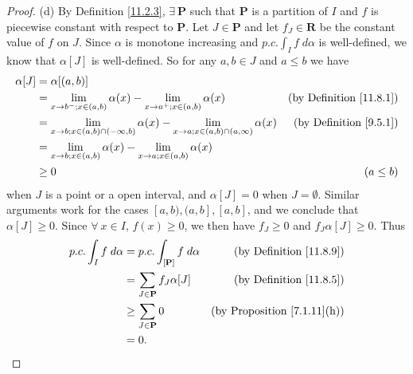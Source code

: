 \begin{proof}{(d)}
    By Definition \ref{11.2.3}, \(\exists\ \mathbf{P}\) such that \(\mathbf{P}\) is a partition of \(I\) and \(f\) is piecewise constant with respect to \(\mathbf{P}\).
    Let \(J \in \mathbf{P}\) and let \(f_J \in \mathbf{R}\) be the constant value of \(f\) on \(J\).
    Since \(\alpha\) is monotone increasing and \(p.c. \int_I f \; d \alpha\) is well-defined, we know that \(\alpha[J]\) is well-defined.
    So for any \(a, b \in J\) and \(a \leq b\) we have
    \begin{align*}
        \alpha[J] & = \alpha[(a, b)]                                                                                                                                             \\
                  & = \lim_{x \to b^- ; x \in (a, b)} \alpha(x) - \lim_{x \to a^+ ; x \in (a, b)} \alpha(x)                                & \text{(by Definition \ref{11.8.1})} \\
                  & = \lim_{x \to b ; x \in (a, b) \cap (-\infty, b)} \alpha(x) - \lim_{x \to a ; x \in (a, b) \cap (a, \infty)} \alpha(x) & \text{(by Definition \ref{9.5.1})}  \\
                  & = \lim_{x \to b ; x \in (a, b)} \alpha(x) - \lim_{x \to a ; x \in (a, b)} \alpha(x)                                                                          \\
                  & \geq 0                                                                                                                 & (a \leq b)
    \end{align*}
    when \(J\) is a point or a open interval, and \(\alpha[J] = 0\) when \(J = \emptyset\).
    Similar arguments work for the cases \([a, b), (a, b], [a, b]\), and we conclude that \(\alpha[J] \geq 0\).
    Since \(\forall\ x \in I\), \(f(x) \geq 0\), we then have \(f_J \geq 0\) and \(f_J \alpha[J] \geq 0\).
    Thus
    \begin{align*}
        p.c. \int_I f \; d \alpha & = p.c. \int_{[\mathbf{P}]} f \; d \alpha & \text{(by Definition \ref{11.8.9})}     \\
                                  & = \sum_{J \in \mathbf{P}} f_J \alpha[J]  & \text{(by Definition \ref{11.8.5})}     \\
                                  & \geq \sum_{J \in \mathbf{P}} 0           & \text{(by Proposition \ref{7.1.11}(h))} \\
                                  & = 0.
    \end{align*}
\end{proof}


